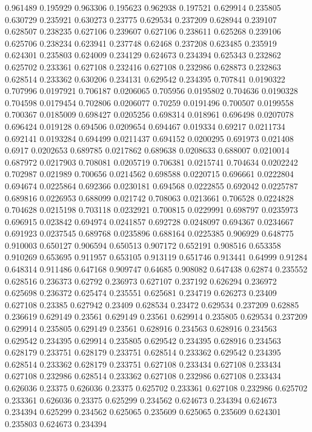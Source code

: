 0.961489 0.195929
0.963306 0.195623
0.962938 0.197521
0.629914 0.235805
0.630729 0.235921
0.630273 0.23775
0.629534 0.237209
0.628944 0.239107
0.628507 0.238235
0.627106 0.239607
0.627106 0.238611
0.625268 0.239106
0.625706 0.238234
0.623941 0.237748
0.62468 0.237208
0.623485 0.235919
0.624301 0.235803
0.624009 0.234129
0.624673 0.234394
0.625343 0.232862
0.625702 0.233361
0.627108 0.232416
0.627108 0.232986
0.628873 0.232863
0.628514 0.233362
0.630206 0.234131
0.629542 0.234395
0.707841 0.0190322
0.707996 0.0197921
0.706187 0.0206065
0.705956 0.0195802
0.704636 0.0190328
0.704598 0.0179454
0.702806 0.0206077
0.70259 0.0191496
0.700507 0.0199558
0.700367 0.0185009
0.698427 0.0205256
0.698314 0.018961
0.696498 0.0207078
0.696424 0.019128
0.694506 0.0209654
0.694467 0.019334
0.69217 0.0211734
0.692141 0.0193284
0.694499 0.0211437
0.694152 0.0200295
0.691973 0.021408
0.6917 0.0202653
0.689785 0.0217862
0.689638 0.0208633
0.688007 0.0210014
0.687972 0.0217903
0.708081 0.0205719
0.706381 0.0215741
0.704634 0.0202242
0.702987 0.021989
0.700656 0.0214562
0.698588 0.0220715
0.696661 0.0222804
0.694674 0.0225864
0.692366 0.0230181
0.694568 0.0222855
0.692042 0.0225787
0.689816 0.0226953
0.688099 0.021742
0.708063 0.0213661
0.706528 0.0224828
0.704628 0.0215198
0.703118 0.0232921
0.700815 0.0229991
0.698797 0.0235973
0.696915 0.023842
0.694974 0.0241857
0.692728 0.0248097
0.694367 0.0234667
0.691923 0.0237545
0.689768 0.0235896
0.688164 0.0225385
0.906929 0.648775
0.910003 0.650127
0.906594 0.650513
0.907172 0.652191
0.908516 0.653358
0.910269 0.653695
0.911957 0.653105
0.913119 0.651746
0.913441 0.64999
0.91284 0.648314
0.911486 0.647168
0.909747 0.64685
0.908082 0.647438
0.62874 0.235552
0.628516 0.236373
0.62792 0.236973
0.627107 0.237192
0.626294 0.236972
0.625698 0.236372
0.625474 0.235551
0.625681 0.234719
0.626273 0.23409
0.627108 0.23385
0.627942 0.23409
0.628534 0.23472
0.629534 0.237209
0.62885 0.236619
0.629149 0.23561
0.629149 0.23561
0.629914 0.235805
0.629534 0.237209
0.629914 0.235805
0.629149 0.23561
0.628916 0.234563
0.628916 0.234563
0.629542 0.234395
0.629914 0.235805
0.629542 0.234395
0.628916 0.234563
0.628179 0.233751
0.628179 0.233751
0.628514 0.233362
0.629542 0.234395
0.628514 0.233362
0.628179 0.233751
0.627108 0.233434
0.627108 0.233434
0.627108 0.232986
0.628514 0.233362
0.627108 0.232986
0.627108 0.233434
0.626036 0.23375
0.626036 0.23375
0.625702 0.233361
0.627108 0.232986
0.625702 0.233361
0.626036 0.23375
0.625299 0.234562
0.624673 0.234394
0.624673 0.234394
0.625299 0.234562
0.625065 0.235609
0.625065 0.235609
0.624301 0.235803
0.624673 0.234394
